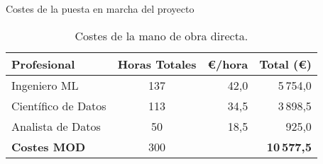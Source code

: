 \begin{frame}{Costes de la puesta en marcha del proyecto}

\begin{table}[H]
\centering
\begin{tabular}{|l|c|r|r|}
\toprule
\textbf{Profesional} & \textbf{Horas Totales} & \textbf{€/hora} & \textbf{Total (€)} \\
\midrule
Ingeniero ML & 137 & 42,0 & 5\,754,0 \\
Científico de Datos & 113 & 34,5 & 3\,898,5 \\
Analista de Datos & 50 & 18,5 & 925,0 \\
\midrule
\textbf{Costes MOD} & 300 & & \textbf{10\,577,5} \\
\bottomrule
\end{tabular}
\caption{Costes de la mano de obra directa.}
\label{tab:costes_totales}
\end{table}

\end{frame}
